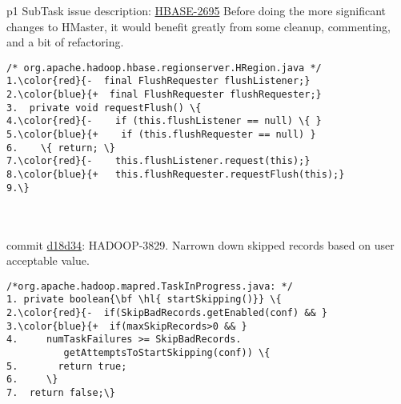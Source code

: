 \begin{figure*}[!htb]
\begin{minipage}{0.47\textwidth}
\begin{tabular}{p{}}
SubTask issue description: \href{https://issues.apache.org/jira/browse/HBASE-2695}{HBASE-2695} Before doing the more significant changes to HMaster, it would benefit greatly from some cleanup, commenting, and a bit of refactoring.
 \begin{Verbatim}[commandchars=\\\{\}, tabsize=2]
 /* org.apache.hadoop.hbase.regionserver.HRegion.java */
1.\color{red}{-  final FlushRequester flushListener;}
2.\color{blue}{+  final FlushRequester flushRequester;}
3.  private void requestFlush() \{ 
4.\color{red}{-    if (this.flushListener == null) \{ }
5.\color{blue}{+    if (this.flushRequester == null) }
6.    \{ return; \}
7.\color{red}{-    this.flushListener.request(this);}
8.\color{blue}{+   this.flushRequester.requestFlush(this);}
9.\}
 \end{Verbatim}
  \vspace*{-4mm}
 \\  \hline 
   \\ \hline
commit  \href{https://github.com/apache/hadoop/commit/d18d34e93#diff-7f17e003fb54ff97abf2007fbd6cdc61}{d18d34}: HADOOP-3829. Narrown down skipped records based on user acceptable value.
 \vspace*{-3mm}
 \begin{Verbatim}[commandchars=\\\{\}, tabsize=2]
 /*org.apache.hadoop.mapred.TaskInProgress.java: */
1. private boolean{\bf \hl{ startSkipping()}} \{
2.\color{red}{-  if(SkipBadRecords.getEnabled(conf) && }
3.\color{blue}{+  if(maxSkipRecords>0 && }
4.     numTaskFailures >= SkipBadRecords.
          getAttemptsToStartSkipping(conf)) \{
5.       return true;
6.     \} 
7.  return false;\}
\end{Verbatim}
 \vspace*{-4mm}
 \\  \hline

\end{tabular}
\end{minipage}
\end{figure*}

